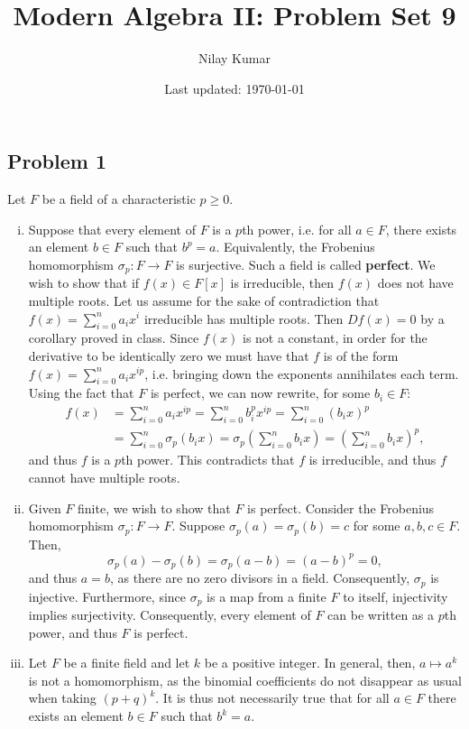 \documentclass{../../mathnotes}
\title{Modern Algebra II: Problem Set 9}
\author{Nilay Kumar}
\date{Last updated: \today}
\begin{document}
\maketitle

\subsection*{Problem 1}

Let $F$ be a field of a characteristic $p\geq 0$.
\begin{enumerate}[(i)]
    \item Suppose that every element of $F$ is a $p$th power, i.e. for all $a\in F$, there exists an element $b\in F$
        such that $b^p=a$. Equivalently, the Frobenius homomorphism $\sigma_p:F\to F$ is surjective. Such a field
        is called \textbf{perfect}. We wish to show that if $f(x)\in F[x]$ is irreducible, then $f(x)$ does not
        have multiple roots. Let us assume for the sake of contradiction that $f(x)=\sum_{i=0}^na_ix^i$ irreducible has multiple roots.
        Then $Df(x)=0$ by a corollary proved in class. Since $f(x)$ is not a constant, in order for the derivative to be
        identically zero we must have that $f$ is of the form $f(x)=\sum_{i=0}^na_ix^{ip}$, i.e. bringing down the exponents
        annihilates each term. Using the fact that $F$ is perfect, we can now rewrite, for some $b_i\in F$:
        \begin{align*}
            f(x)&=\sum_{i=0}^na_ix^{ip}=\sum_{i=0}^nb_i^px^{ip}=\sum_{i=0}^n(b_ix)^p\\
            &=\sum_{i=0}^n\sigma_p(b_ix)=\sigma_p\left(\sum_{i=0}^nb_ix\right)=\left( \sum_{i=0}^nb_ix \right)^p,
        \end{align*}
        and thus $f$ is a $p$th power. This contradicts that $f$ is irreducible, and thus $f$ cannot have multiple roots.
    \item Given $F$ finite, we wish to show that $F$ is perfect. Consider the Frobenius homomorphism
        $\sigma_p:F\to F$. Suppose $\sigma_p(a)=\sigma_p(b)=c$ for some $a,b,c\in F$. Then,
        \[\sigma_p(a)-\sigma_p(b)=\sigma_p(a-b)= (a-b)^p=0,\]
        and thus $a=b$, as there are no zero divisors in a field. Consequently, $\sigma_p$ is injective. Furthermore,
        since $\sigma_p$ is a map from a finite $F$ to itself, injectivity implies surjectivity. Consequently, every
        element of $F$ can be written as a $p$th power, and thus $F$ is perfect.
    \item Let $F$ be a finite field and let $k$ be a positive integer. In general, then, $a\mapsto a^k$ is not
        a homomorphism, as the binomial coefficients do not disappear as usual when taking $(p+q)^k$.
        It is thus not necessarily true that for all $a\in F$ there exists an element $b\in F$ such that $b^k=a$.
\end{enumerate}
\end{document}
